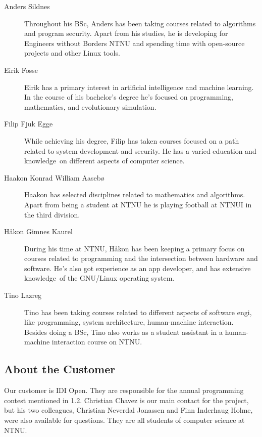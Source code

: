 \begin{description}
\item[Anders Sildnes]
Throughout his BSc, Anders has been taking courses related to algorithms
and program security. Apart from his studies, he is developing for
Engineers without Borders NTNU and spending time with open-source
projects and other Linux tools.

\item[Eirik Fosse]
Eirik has a primary interest in artificial intelligence and machine
learning. In the course of his bachelor's degree
he's focused on programming, mathematics, and
evolutionary simulation.

\item[Filip Fjuk Egge]
While achieving his degree, Filip has taken courses focused on a path
related to system development and security. He has a varied education
and knowledge\ on different aspects of computer science. 

\item[Haakon Konrad William Aaseb{\o}]
Haakon has selected disciplines related to mathematics and algorithms.
Apart from being a student at NTNU he is playing football at NTNUI in
the third division. 

\item[H{\aa}kon Gimnes Kaurel]
During his time at NTNU, H{\aa}kon has been keeping a primary focus on
courses related to programming and the intersection between hardware
and software. He's also got experience as an app
developer, and has extensive knowledge\ of the GNU/Linux operating
system. 

\item[Tino Lazreg]
Tino has been taking courses related to different aspects of software
engi\neering, like programming, system architecture, human-machine
interaction. Besides doing a BSc, Tino also works as a student
assistant in a human-machine interaction course on NTNU. 
\end{description}

\subsection{About the Customer}
Our customer is IDI Open. They are responsible for the annual
programming contest mentioned in 1.2. Christian Chavez is our main contact for
the project, but his two colleagues, Christian Neverdal Jonassen and Finn
Inderhaug Holme, were
also available for questions. They are all students of computer science
at NTNU. 

